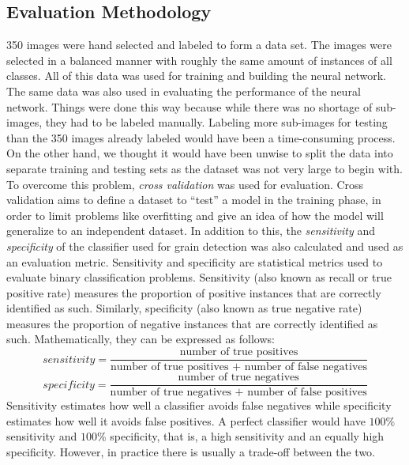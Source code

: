\subsection{Evaluation Methodology}
350 images were hand selected and labeled to form a data set. The images were selected in a balanced manner with roughly the same amount of instances of all classes. All of this data was used for training and building the neural network. The same data was also used in evaluating the performance of the neural network. Things were done this way because while there was no shortage of sub-images, they had to be labeled manually. Labeling more sub-images for testing than the 350 images already labeled would have been a time-consuming process. On the other hand, we thought it would have been unwise to split the data into separate training and testing sets as the dataset was not very large to begin with. To overcome this problem, \textit{cross validation} was used for evaluation. Cross validation aims to define a dataset to ``test'' a model in the training phase, in order to limit problems like overfitting and give an idea of how the model will generalize to an independent dataset. In addition to this, the \textit{sensitivity} and \textit{specificity} of the classifier used for grain detection was also calculated and used as an evaluation metric. Sensitivity and specificity are statistical metrics used to evaluate binary classification problems. Sensitivity (also known as recall or true positive rate) measures the proportion of positive instances that are correctly identified as such. Similarly, specificity (also known as true negative rate) measures the proportion of negative instances that are correctly identified as such. Mathematically, they can be expressed as follows:
\begin{equation}
sensitivity = \frac{\text{number of true positives}}{\text{number of true positives + number of false negatives}} 
\end{equation}
\begin{equation}
specificity = \frac{\text{number of true negatives}}{\text{number of true negatives + number of false positives}} 
\end{equation}
Sensitivity estimates how well a classifier avoids false negatives while specificity estimates how well it avoids false positives. A perfect classifier would have $100\%$ sensitivity and $100\%$ specificity, that is, a high sensitivity and an equally high specificity. However, in practice there is usually a trade-off between the two.



